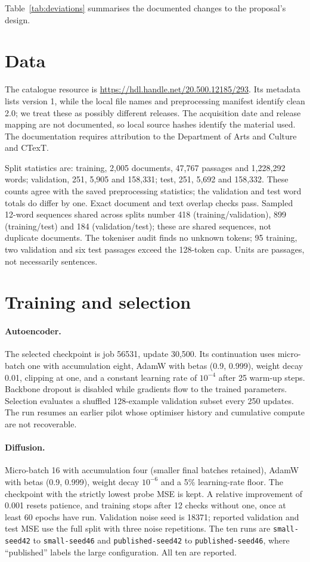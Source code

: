 \documentclass[11pt,a4paper]{article}
\begin{document}
Table~\ref{tab:deviations} summarises the documented changes to the proposal's design.

\section{Data}
\label{app:data}

The catalogue resource is \url{https://hdl.handle.net/20.500.12185/293}. Its metadata lists version 1, while the local file names and preprocessing manifest identify clean 2.0; we treat these as possibly different releases. The acquisition date and release mapping are not documented, so local source hashes identify the material used. The documentation requires attribution to the Department of Arts and Culture and CTexT.

Split statistics are: training, 2,005 documents, 47,767 passages and 1,228,292 words; validation, 251, 5,905 and 158,331; test, 251, 5,692 and 158,332. These counts agree with the saved preprocessing statistics; the validation and test word totals do differ by one. Exact document and text overlap checks pass. Sampled 12-word sequences shared across splits number 418 (training/validation), 899 (training/test) and 184 (validation/test); these are shared sequences, not duplicate documents. The tokeniser audit finds no unknown tokens; 95 training, two validation and six test passages exceed the 128-token cap. Units are passages, not necessarily sentences.

\section{Training and selection}
\label{app:training}

\paragraph{Autoencoder.} The selected checkpoint is job 56531, update 30,500. Its continuation uses micro-batch one with accumulation eight, AdamW with betas (0.9, 0.999), weight decay 0.01, clipping at one, and a constant learning rate of $10^{-4}$ after 25 warm-up steps. Backbone dropout is disabled while gradients flow to the trained parameters. Selection evaluates a shuffled 128-example validation subset every 250 updates. The run resumes an earlier pilot whose optimiser history and cumulative compute are not recoverable.

\paragraph{Diffusion.} Micro-batch 16 with accumulation four (smaller final batches retained), AdamW with betas (0.9, 0.999), weight decay $10^{-6}$ and a 5\% learning-rate floor. The checkpoint with the strictly lowest probe MSE is kept. A relative improvement of 0.001 resets patience, and training stops after 12 checks without one, once at least 60 epochs have run. Validation noise seed is 18371; reported validation and test MSE use the full split with three noise repetitions. The ten runs are \texttt{small-seed42} to \texttt{small-seed46} and \texttt{published-seed42} to \texttt{published-seed46}, where ``published'' labels the large configuration. All ten are reported.
\end{document}
